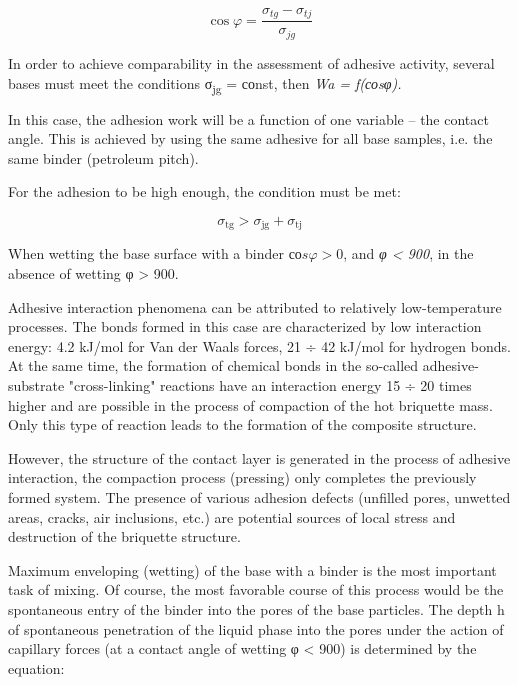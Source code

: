 \begin{multicols}{2}
\begin{equation*}
    \cos\varphi = \frac{\sigma_{tg} - \sigma_{tj}}{\sigma_{jg}}
\end{equation*}

In order to achieve comparability in the assessment of adhesive
activity, several bases must meet the conditions σ\textsubscript{jg} =
соnst, then \emph{Wa = f(соsφ).}

In this case, the adhesion work will be a function of one variable --
the contact angle. This is achieved by using the same adhesive for all
base samples, i.e. the same binder (petroleum pitch).

For the adhesion to be high enough, the condition must be met:

\begin{equation*}
    \sigma_{\text{tg}} > \sigma_{\text{jg}} + \sigma_{\text{tj}}
\end{equation*}

When wetting the base surface with a binder \(соs\varphi > 0\), and
\emph{φ \textless{} 900}, in the absence of wetting φ \textgreater{}
900.

Adhesive interaction phenomena can be attributed to relatively
low-temperature processes. The bonds formed in this case are
characterized by low interaction energy: 4.2 kJ/mol for Van der Waals
forces, 21 ÷ 42 kJ/mol for hydrogen bonds. At the same time, the
formation of chemical bonds in the so-called adhesive-substrate
"cross-linking" reactions have an interaction energy 15 ÷ 20 times
higher and are possible in the process of compaction of the hot
briquette mass. Only this type of reaction leads to the formation of the
composite structure.

However, the structure of the contact layer is generated in the process
of adhesive interaction, the compaction process (pressing) only
completes the previously formed system. The presence of various adhesion
defects (unfilled pores, unwetted areas, cracks, air inclusions, etc.)
are potential sources of local stress and destruction of the briquette
structure.

Maximum enveloping (wetting) of the base with a binder is the most
important task of mixing. Of course, the most favorable course of this
process would be the spontaneous entry of the binder into the pores of
the base particles. The depth h of spontaneous penetration of the liquid
phase into the pores under the action of capillary forces (at a contact
angle of wetting φ \textless{} 900) is determined by the equation:


\end{multicols}
